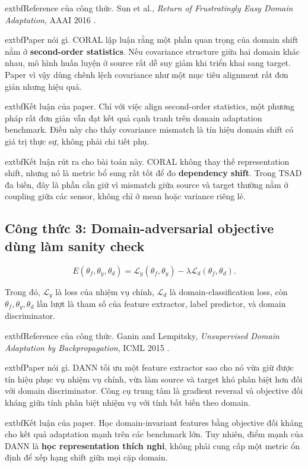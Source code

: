 \documentclass[a4paper]{article}
\begin{document}
	extbf{Reference của công thức.} Sun et al., \emph{Return of Frustratingly Easy Domain Adaptation}, AAAI 2016 \cite{coral}.

	extbf{Paper nói gì.} CORAL lập luận rằng một phần quan trọng của domain shift nằm ở \textbf{second-order statistics}. Nếu covariance structure giữa hai domain khác nhau, mô hình huấn luyện ở source rất dễ suy giảm khi triển khai sang target. Paper vì vậy dùng chênh lệch covariance như một mục tiêu alignment rất đơn giản nhưng hiệu quả.

	extbf{Kết luận của paper.} Chỉ với việc align second-order statistics, một phương pháp rất đơn giản vẫn đạt kết quả cạnh tranh trên domain adaptation benchmark. Điều này cho thấy covariance mismatch là tín hiệu domain shift có giá trị thực sự, không phải chi tiết phụ.

	extbf{Kết luận rút ra cho bài toán này.} CORAL không thay thế representation shift, nhưng nó là metric bổ sung rất tốt để đo \textbf{dependency shift}. Trong TSAD đa biến, đây là phần cần giữ vì mismatch giữa source và target thường nằm ở coupling giữa các sensor, không chỉ ở mean hoặc variance riêng lẻ.

\subsection{Công thức 3: Domain-adversarial objective dùng làm sanity check}

\[
E(\theta_f,\theta_y,\theta_d)
= \mathcal{L}_y(\theta_f,\theta_y)
- \lambda \mathcal{L}_d(\theta_f,\theta_d).
\]

Trong đó, \(\mathcal{L}_y\) là loss của nhiệm vụ chính, \(\mathcal{L}_d\) là domain-classification loss, còn \(\theta_f, \theta_y, \theta_d\) lần lượt là tham số của feature extractor, label predictor, và domain discriminator.

	extbf{Reference của công thức.} Ganin and Lempitsky, \emph{Unsupervised Domain Adaptation by Backpropagation}, ICML 2015 \cite{dann}.

	extbf{Paper nói gì.} DANN tối ưu một feature extractor sao cho nó vừa giữ được tín hiệu phục vụ nhiệm vụ chính, vừa làm source và target khó phân biệt hơn đối với domain discriminator. Công cụ trung tâm là gradient reversal và objective đối kháng giữa tính phân biệt nhiệm vụ với tính bất biến theo domain.

	extbf{Kết luận của paper.} Học domain-invariant features bằng objective đối kháng cho kết quả adaptation mạnh trên các benchmark lớn. Tuy nhiên, điểm mạnh của DANN là \textbf{học representation thích nghi}, không phải cung cấp một metric ổn định để xếp hạng shift giữa mọi cặp domain.
\end{document}
